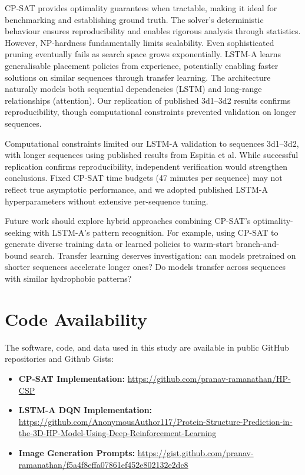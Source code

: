 \documentclass[12pt, oneside, openany]{book}
\theoremstyle{plain}
\theoremstyle{definition}
\begin{document}
CP-SAT provides optimality guarantees when tractable, making it ideal for benchmarking and establishing ground truth. The solver's deterministic behaviour ensures reproducibility and enables rigorous analysis through statistics. However, NP-hardness fundamentally limits scalability. Even sophisticated pruning eventually fails as search space grows exponentially. LSTM-A learns generalisable placement policies from experience, potentially enabling faster solutions on similar sequences through transfer learning. The architecture naturally models both sequential dependencies (LSTM) and long-range relationships (attention). Our replication of published 3d1--3d2 results confirms reproducibility, though computational constraints prevented validation on longer sequences. 

Computational constraints limited our LSTM-A validation to sequences 3d1--3d2, with longer sequences using published results from Espitia et al. While successful replication confirms reproducibility, independent verification would strengthen conclusions. Fixed CP-SAT time budgets (47 minutes per sequence) may not reflect true asymptotic performance, and we adopted published LSTM-A hyperparameters without extensive per-sequence tuning.

Future work should explore hybrid approaches combining CP-SAT's optimality-seeking with LSTM-A's pattern recognition. For example, using CP-SAT to generate diverse training data or learned policies to warm-start branch-and-bound search. Transfer learning deserves investigation: can models pretrained on shorter sequences accelerate longer ones? Do models transfer across sequences with similar hydrophobic patterns?

\section*{Code Availability}

The software, code, and data used in this study are available in public GitHub repositories and Github Gists:

\begin{itemize}
    \item \textbf{CP-SAT Implementation:} \url{https://github.com/pranav-ramanathan/HP-CSP}
    \item \textbf{LSTM-A DQN Implementation:} \url{https://github.com/AnonymousAuthor117/Protein-Structure-Prediction-in-the-3D-HP-Model-Using-Deep-Reinforcement-Learning}
    \item \textbf{Image Generation Prompts:} \url{https://gist.github.com/pranav-ramanathan/f5a4f8effa07861ef452e802132e2dc8}
\end{itemize}



  
\end{document}
